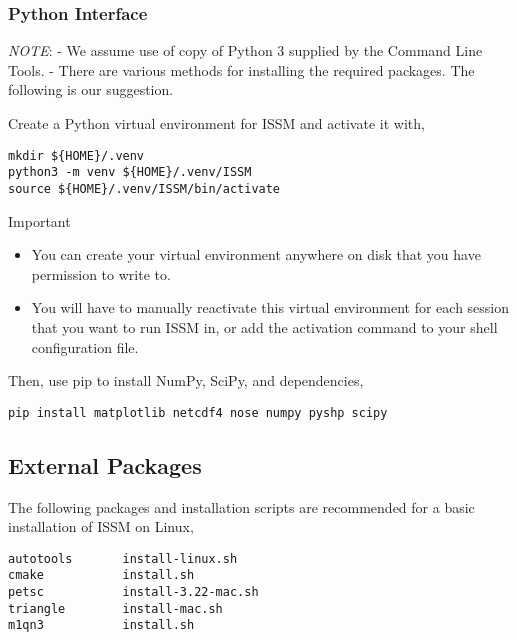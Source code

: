 \label{sec:macos-python-interface}
\subsubsection{Python Interface}
\emph{NOTE}:
- We assume use of copy of Python 3 supplied by the Command Line Tools.
- There are various methods for installing the required packages. The following is our suggestion.

Create a Python virtual environment for ISSM and activate it with,
\begin{lstlisting}
mkdir ${HOME}/.venv
python3 -m venv ${HOME}/.venv/ISSM
source ${HOME}/.venv/ISSM/bin/activate
\end{lstlisting}

\begin{calloutHighlight}{Important}
\begin{itemize}
	\item You can create your virtual environment anywhere on disk that you have permission to write to.
	\item You will have to manually reactivate this virtual environment for each session that you want to run ISSM in, or add the activation command to your shell configuration file.
\end{itemize}
\end{calloutHighlight}

Then, use pip to install NumPy, SciPy, and dependencies,
\begin{lstlisting}
pip install matplotlib netcdf4 nose numpy pyshp scipy
\end{lstlisting}

\subsection{External Packages}
The following packages and installation scripts are recommended for a basic installation of ISSM on Linux,
\begin{lstlisting}
autotools		install-linux.sh
cmake			install.sh
petsc			install-3.22-mac.sh
triangle		install-mac.sh
m1qn3			install.sh
\end{lstlisting}

